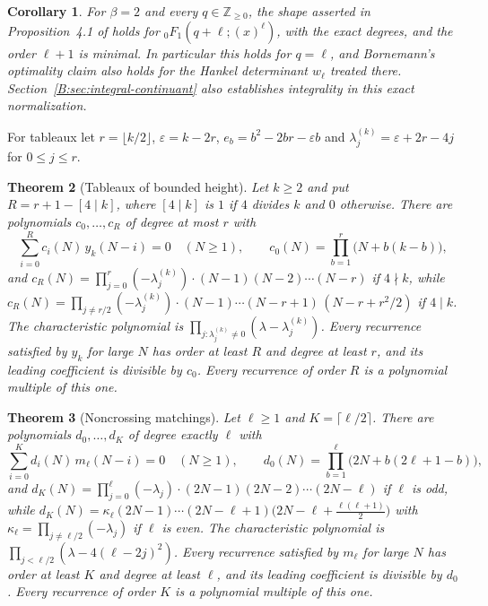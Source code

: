 \documentclass[11pt,a4paper]{article}
\newtheorem{theorem}{Theorem}[section]
\newtheorem{corollary}[theorem]{Corollary}
\theoremstyle{definition}
\theoremstyle{remark}
\newcommand{\Z}{\mathbb Z}
\newcommand{\fl}[1]{\lfloor #1\rfloor}
\newcommand{\cl}[1]{\lceil #1\rceil}
\numberwithin{equation}{section}
\begin{document}
\begin{corollary}\label{B:cor:FW41q}
For $\beta=2$ and every $q\in\Z_{\ge0}$, the shape asserted in Proposition~4.1 of \cite{FW26} holds for ${}_0F_1(q+\ell;(x)^\ell)$, with the exact degrees, and the order $\ell+1$ is minimal. In particular this holds for $q=\ell$, and Bornemann's optimality claim \cite[App.~B]{FW26} also holds for the Hankel determinant $w_\ell$ treated there. Section~\ref{B:sec:integral-continuant} also establishes integrality in this exact normalization.
\end{corollary}

For tableaux let $r=\fl{k/2}$, $\varepsilon=k-2r$, $e_b=b^2-2br-\varepsilon b$ and $\lambda^{(k)}_j=\varepsilon+2r-4j$ for $0\le j\le r$.

\begin{theorem}[Tableaux of bounded height]\label{B:thm:C}
Let $k\ge2$ and put $R=r+1-[4\mid k]$, where $[4\mid k]$ is $1$ if $4$ divides $k$ and $0$ otherwise. There are polynomials $c_0,\dots,c_R$ of degree at most $r$ with
\[
\sum_{i=0}^{R}c_i(N)\,y_k(N-i)=0\quad(N\ge1),\qquad c_0(N)=\prod_{b=1}^{r}\bigl(N+b(k-b)\bigr),
\]
and $c_R(N)=\prod_{j=0}^{r}(-\lambda^{(k)}_j)\cdot(N-1)(N-2)\cdots(N-r)$ if $4\nmid k$, while $c_R(N)=\prod_{j\ne r/2}(-\lambda^{(k)}_j)\cdot(N-1)\cdots(N-r+1)\,(N-r+r^2/2)$ if $4\mid k$. The characteristic polynomial is $\prod_{j:\lambda^{(k)}_j\ne0}(\lambda-\lambda^{(k)}_j)$. Every recurrence satisfied by $y_k$ for large $N$ has order at least $R$ and degree at least $r$, and its leading coefficient is divisible by $c_0$. Every recurrence of order $R$ is a polynomial multiple of this one.
\end{theorem}

\begin{theorem}[Noncrossing matchings]\label{B:thm:D}
Let $\ell\ge1$ and $K=\cl{\ell/2}$. There are polynomials $d_0,\dots,d_K$ of degree exactly $\ell$ with
\[
\sum_{i=0}^{K}d_i(N)\,m_\ell(N-i)=0\quad(N\ge1),\qquad d_0(N)=\prod_{b=1}^{\ell}\bigl(2N+b(2\ell+1-b)\bigr),
\]
and $d_K(N)=\prod_{j=0}^{\ell}(-\lambda_j)\cdot(2N-1)(2N-2)\cdots(2N-\ell)$ if $\ell$ is odd, while $d_K(N)=\kappa_\ell(2N-1)\cdots(2N-\ell+1)\bigl(2N-\ell+\tfrac{\ell(\ell+1)}2\bigr)$ with $\kappa_\ell=\prod_{j\ne\ell/2}(-\lambda_j)$ if $\ell$ is even. The characteristic polynomial is $\prod_{j<\ell/2}(\lambda-4(\ell-2j)^2)$. Every recurrence satisfied by $m_\ell$ for large $N$ has order at least $K$ and degree at least $\ell$, and its leading coefficient is divisible by $d_0$. Every recurrence of order $K$ is a polynomial multiple of this one.
\end{theorem}
\end{document}
